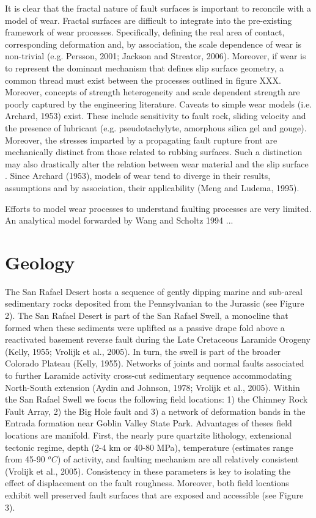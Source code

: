 \documentclass[12pt,a4paper]{article}
\begin{document}
It is clear that the fractal nature of fault surfaces is important to reconcile with a model of wear. Fractal surfaces are difficult to integrate into the pre-existing framework of wear processes. Specifically, defining the real area of contact, corresponding deformation and, by association, the scale dependence of wear is non-trivial (e.g. Persson, 2001; Jackson and Streator, 2006). Moreover, if wear is to represent the dominant mechanism that defines slip  surface geometry, a common thread must exist between the processes outlined in figure XXX. Moreover, concepts of strength heterogeneity and scale dependent strength are poorly captured by the engineering literature. Caveats to simple wear models (i.e. Archard, 1953) exist. These include sensitivity to fault rock, sliding velocity and the presence of lubricant (e.g. pseudotachylyte, amorphous silica gel and gouge). Moreover, the stresses imparted by a propagating fault rupture front are mechanically distinct from those related to rubbing surfaces. Such a distinction may also drastically alter the relation between wear material and the slip surface \cite{sibson1977fault}. Since Archard (1953), models of wear tend to diverge in their results, assumptions and by association, their applicability (Meng and Ludema, 1995).

Efforts to model wear processes to understand faulting processes are very limited. An analytical model forwarded by Wang and Scholtz 1994 ...




\section{Geology}

The San Rafael Desert hosts a sequence of gently dipping marine and sub-areal sedimentary rocks deposited from the Pennsylvanian to the Jurassic (see Figure 2). The San Rafael Desert is part of the San Rafael Swell, a monocline that formed when these sediments were uplifted as a passive drape fold above a reactivated basement reverse fault during the Late Cretaceous Laramide Orogeny (Kelly, 1955; Vrolijk et al., 2005). In turn, the swell is part of the broader Colorado Plateau (Kelly, 1955). Networks of joints and normal faults associated to further Laramide activity cross-cut sedimentary sequence accommodating North-South extension (Aydin and Johnson, 1978; Vrolijk et al., 2005). Within the San Rafael Swell we focus the following field locations: 1) the Chimney Rock Fault Array, 2) the Big Hole fault and 3) a network of deformation bands in the Entrada formation near Goblin Valley State Park.  Advantages of theses field locations are manifold. First, the nearly pure quartzite lithology, extensional tectonic regime, depth (2-4 km or 40-80 MPa), temperature (estimates range from 45-90 $^oC$) of activity, and faulting mechanism are all relatively consistent (Vrolijk et al., 2005). Consistency in these parameters is key to isolating the effect of displacement on the fault roughness. Moreover, both field locations exhibit well preserved fault surfaces that are exposed and accessible (see Figure 3). 
\end{document}
